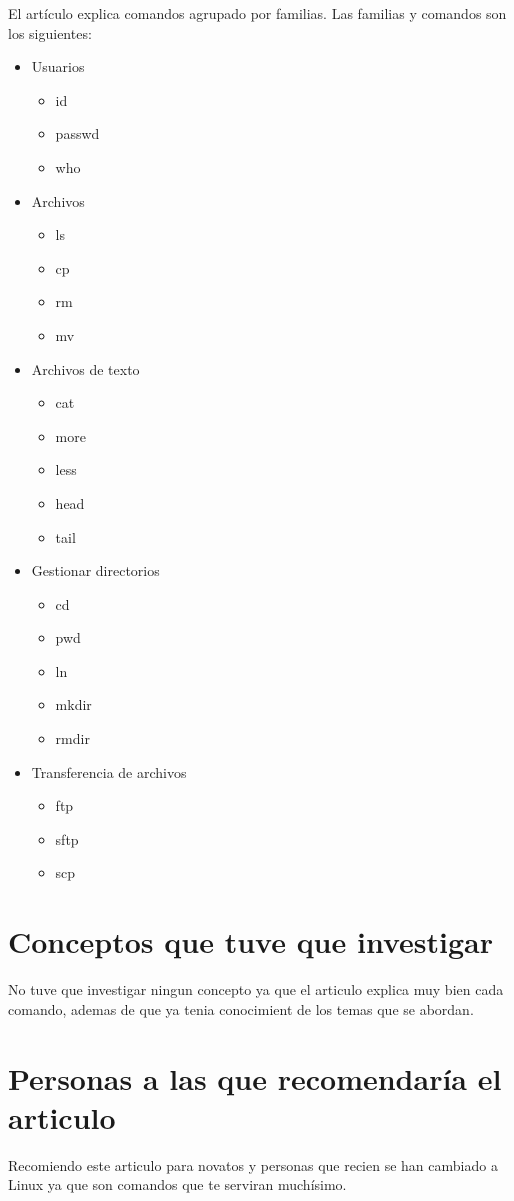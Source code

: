 \documentclass[11pt, a4paper]{report}
\begin{document}
El artículo explica comandos agrupado por familias. Las familias y comandos son
los siguientes:

\begin{itemize}
\item Usuarios
  \begin{itemize}
  \item id
  \item passwd
  \item who
  \end{itemize}
\item Archivos
  \begin{itemize}
  \item ls
  \item cp 
  \item rm 
  \item mv
  \end{itemize}
\item Archivos de texto
  \begin{itemize}
  \item cat
  \item more 
  \item less 
  \item head
  \item tail
  \end{itemize}
\item Gestionar directorios
  \begin{itemize} 
  \item cd 
  \item pwd 
  \item ln 
  \item mkdir
  \item rmdir
  \end{itemize}
\item Transferencia de archivos
  \begin{itemize}
  \item ftp
  \item sftp
  \item scp
  \end{itemize}  
\end{itemize}

\section*{Conceptos que tuve que investigar}
No tuve que investigar ningun concepto ya que el articulo explica muy bien cada
comando, ademas de que ya tenia conocimient de los temas que se abordan. 

\section*{Personas a las que recomendaría el articulo}
Recomiendo este articulo para novatos y personas que recien se han cambiado a
Linux ya que son comandos que te serviran muchísimo.
\end{document}
